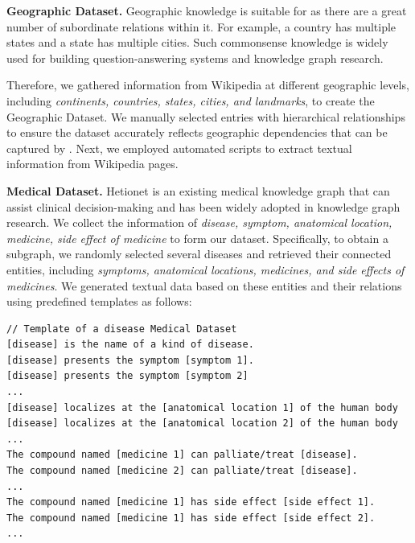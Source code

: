 {\bf Geographic Dataset.} Geographic knowledge is suitable for \rag as there are a great number of subordinate relations within it. For example, a country has multiple states and a state has multiple cities. Such commonsense knowledge is widely used for building question-answering systems and knowledge graph research.

Therefore, we gathered information from Wikipedia at different geographic levels, including \emph{continents, countries, states, cities, and landmarks}, to create the Geographic Dataset. We manually selected entries with hierarchical relationships to ensure the dataset accurately reflects geographic dependencies that can be captured by \rag. Next, we employed automated scripts to extract textual information from Wikipedia pages.




{\bf Medical Dataset.} Hetionet is an existing medical knowledge graph that can assist clinical decision-making and has been widely adopted in knowledge graph research. We collect the information of \emph{disease, symptom, anatomical location, medicine, side effect of medicine} to form our dataset. Specifically, to obtain a subgraph, we randomly selected several diseases and retrieved their connected entities, including \emph{symptoms, anatomical locations, medicines, and side effects of medicines}. We generated textual data based on these entities and their relations using predefined templates as follows:
\begin{lstlisting}
// Template of a disease Medical Dataset
[disease] is the name of a kind of disease.
[disease] presents the symptom [symptom 1].
[disease] presents the symptom [symptom 2]
...
[disease] localizes at the [anatomical location 1] of the human body
[disease] localizes at the [anatomical location 2] of the human body
...
The compound named [medicine 1] can palliate/treat [disease].
The compound named [medicine 2] can palliate/treat [disease].
...
The compound named [medicine 1] has side effect [side effect 1].
The compound named [medicine 1] has side effect [side effect 2].
...
\end{lstlisting}



